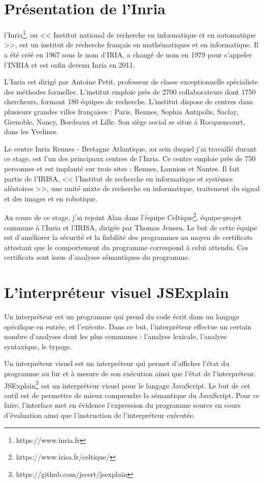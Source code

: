 \documentclass[a4paper,10pt]{article}
\begin{document}
\section{Présentation de l'Inria}
l'Inria\footnote{https://www.inria.fr}, ou << Institut national de recherche en 
informatique et en automatique >>, est un institut de recherche français en 
mathématiques et en informatique. Il a été créé en 1967 sous le nom d'IRIA, a 
changé de nom en 1979 pour s'appeler l'INRIA et est enfin devenu Inria en 2011.

L'Inria est dirigé par Antoine Petit, professeur de classe exceptionnelle 
spécialiste des méthodes formelles. L'institut emploie près de 2700
collaborateurs dont 1750 chercheurs, formant 180 équipes de recherche. 
L'institut dispose de centres dans plusieurs grandes villes françaises : Paris, 
Rennes, Sophia Antipolis, Saclay, Grenoble, Nancy, Bordeaux et Lille. Son 
siège social se situe à Rocquencourt, dans les Yvelines.

Le centre Inria Rennes - Bretagne Atlantique, au sein duquel j'ai travaillé 
durant ce stage, est l'un des principaux centres de l'Inria. Ce centre emploie 
près de 750 personnes et est implanté sur trois sites : Rennes, Lannion et 
Nantes. Il fait partie de l'IRISA, << l'Institut de recherche en informatique et 
systèmes aléatoires >>, une unité mixte de recherche en informatique, traitement 
du signal et des images et en robotique.

Au cours de ce stage, j'ai rejoint Alan dans l'équipe 
Celtique\footnote{https://www.irisa.fr/celtique/}, équipe-projet commune à 
l'Inria et l'IRISA, dirigée par Thomas Jensen. Le but de cette équipe est 
d'améliorer la sécurité et la fiabilité des programmes au moyen de certificats 
attestant que le comportement du programme correspond à celui attendu. Ces 
certificats sont issus d'analyses sémantiques du programme.

\section{L'interpréteur visuel JSExplain}

Un interpréteur est un programme qui prend du code écrit dans un langage 
spécifique en entrée, et l'exécute. Dans ce but, l'interpréteur effectue un 
certain nombre d'analyses dont les plus communes : l'analyse lexicale, 
l'analyse syntaxique, le typage.

Un interpréteur visuel est un interpréteur qui permet d'afficher l'état du 
programme au fur et à mesure de son exécution ainsi que l'état de 
l'interpréteur. JSExplain\footnote{https://github.com/jscert/jsexplain} est un 
interpréteur visuel pour le langage JavaScript. Le but de cet outil est de 
permettre de mieux comprendre la sémantique du JavaScript. Pour ce faire, 
l'interface met en évidence l'expression du programme source en cours 
d'évaluation ainsi que l'instruction de l'interpréteur exécutée.
\end{document}
